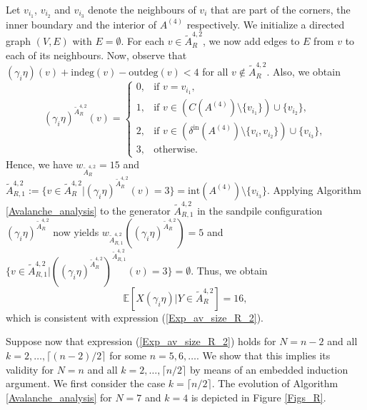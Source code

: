 \documentclass{article}
\begin{document}
    Let $v_{i_1}$, $v_{i_2}$ and $v_{i_3}$ denote the neighbours of $v_i$ that are part of the corners, the inner boundary and the interior of $A^{(4)}$ respectively. We initialize a directed graph $(V, E)$ with $E = \emptyset$. For each $v \in \tilde{A}_R^{4,2}$, we now add edges to $E$ from $v$ to each of its neighbours. Now, observe that $(\gamma_i \eta)(v) + \text{indeg}(v) - \text{outdeg}(v) < 4$ for all $v \notin \tilde{A}_R^{4,2}$. Also, we obtain 
    \begin{equation*}
        (\gamma_i \eta)^{\tilde{A}_R^{4,2}}(v) = \begin{cases}
            0, &\text{if } v = v_{i_1}, \\
            1, &\text{if } v \in (C(A^{(4)}) \setminus \{v_{i_1}\}) \cup \{v_{i_2}\}, \\
            2, &\text{if } v \in (\delta^{\text{in}}(A^{(4)}) \setminus \{v_i, v_{i_2}\}) \cup \{v_{i_3}\}, \\
            3, &\text{otherwise.}
        \end{cases}
    \end{equation*}
    Hence, we have $w_{\tilde{A}_R^{4,2}} = 15$ and $\tilde{A}_{R,1}^{4,2} := \{v \in \tilde{A}_R^{4,2}|(\gamma_i \eta)^{\tilde{A}_R^{4,2}}(v) = 3\} = \text{int}(A^{(4)}) \setminus \{v_{i_3}\}$. Applying Algorithm \ref{Avalanche_analysis} to the generator $\tilde{A}_{R,1}^{4,2}$ in the sandpile configuration $(\gamma_i \eta)^{\tilde{A}_R^{4,2}}$ now yields $w_{\tilde{A}_{R,1}^{4,2}}((\gamma_i \eta)^{\tilde{A}_R^{4,2}}) = 5$ and $\{v \in \tilde{A}_{R,1}^{4,2}|((\gamma_i \eta)^{\tilde{A}_R^{4,2}})^{\tilde{A}_{R,1}^{4,2}}(v) = 3\} = \emptyset$. Thus, we obtain
    \begin{equation*}
        \mathbb{E}[X(\gamma_i \eta)|Y \in \tilde{A}^{4,2}_R] = 16,
    \end{equation*}
    which is consistent with expression (\ref{Exp_av_size_R_2}).

    
    Suppose now that expression (\ref{Exp_av_size_R_2}) holds for $N = n-2$ and all $k = 2, \ldots, \lceil (n-2)/2 \rceil$ for some $n = 5, 6, \ldots$. We show that this implies its validity for $N = n$ and all $k = 2, \ldots, \lceil n/2 \rceil$ by means of an embedded induction argument. We first consider the case $k = \lceil n/2 \rceil$. The evolution of Algorithm \ref{Avalanche_analysis} for $N = 7$ and $k = 4$ is depicted in Figure \ref{Figs_R}. 
\end{document}
